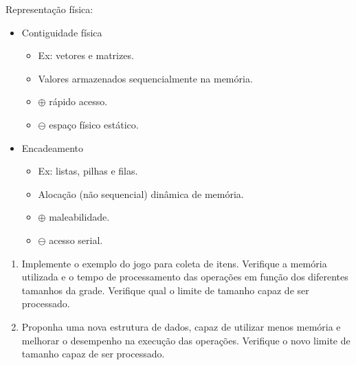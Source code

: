\medskip

Representação física:
\begin{itemize}
	\item Contiguidade física
	\begin{itemize}
		\item Ex: vetores e matrizes.
		\item Valores armazenados sequencialmente na memória.
		\item $\oplus$ rápido acesso.
		\item $\ominus$ espaço físico estático.
	\end{itemize}
	\item Encadeamento
	\begin{itemize}
		\item Ex: listas, pilhas e filas.
		\item Alocação (não sequencial) dinâmica de memória.
		\item $\oplus$ maleabilidade.
		\item $\ominus$ acesso serial.
	\end{itemize}
\end{itemize}

\clearpage


\begin{enumerate}
	\item Implemente o exemplo do jogo para coleta de itens. Verifique a memória utilizada e o tempo de processamento das operações em função dos diferentes tamanhos da grade. Verifique qual o limite de tamanho capaz de ser processado.
	
	\item Proponha uma nova estrutura de dados, capaz de utilizar menos memória e melhorar o desempenho na execução das operações. Verifique o novo limite de tamanho capaz de ser processado.
\end{enumerate}

\medskip

\begingroup
	\footnotesize
	\renewcommand{\chapter}[2]{}%
	
	
\endgroup

